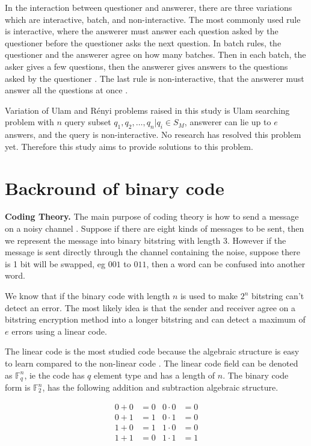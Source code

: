 \documentclass[conference,compsoc]{IEEEtran}
\begin{document}
In the interaction between questioner and answerer, there are three variations which are interactive, batch, and non-interactive. The most commonly used rule is interactive, where the answerer must answer each question asked by the questioner before the questioner asks the next question. In batch rules, the questioner and the answerer agree on how many batches. Then in each batch, the asker gives a few questions, then the answerer gives answers to the questions asked by the questioner \cite{Cicalese2000}. The last rule is non-interactive, that the answerer must answer all the questions at once \cite{Macula1997}.

Variation of Ulam and Rényi problems raised in this study is Ulam searching problem with $n$ query subset ${q_1,q_2,\ldots,q_n} | q_i \in S_M$, answerer can lie up to $e$ answers, and the query is non-interactive. No research has resolved this problem yet. Therefore this study aims to provide solutions to this problem.


\section{Backround of binary code}

\noindent \textbf{Coding Theory.}
The main purpose of coding theory is how to send a message on a noisy channel \cite{VanLint2016}. Suppose if there are eight kinds of messages to be sent, then we represent the message into binary bitstring with length 3. However if the message is sent directly through the channel containing the noise, suppose there is 1 bit will be swapped, eg $001$ to $011$, then a word can be confused into another word.

We know that if the binary code with length $n$ is used to make $2^n$ bitstring can't detect an error. The most likely idea is that the sender and receiver agree on a bitstring encryption method into a longer bitstring and can detect a maximum of $e$ errors using a linear code.

The linear code is the most studied code because the algebraic structure is easy to learn compared to the non-linear code \cite{Huffman}. The linear code field can be denoted as $\mathbb{F}_q^n$, ie the code has $q$ element type and has a length of $n$. The binary code form is $\mathbb{F}_2^n $, has the following addition and subtraction algebraic structure.

\begin{align*}
0 + 0 &= 0 & 0 \cdot 0 &= 0 \\
0 + 1 &= 1 & 0 \cdot 1 &= 0 \\
1 + 0 &= 1 & 1 \cdot 0 &= 0 \\
1 + 1 &= 0 & 1 \cdot 1 &= 1
\end{align*}
\end{document}
